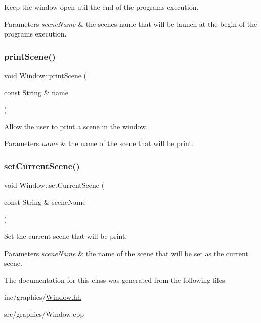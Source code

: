 Keep the window open util the end of the program\textquotesingle{}s execution. 


\begin{DoxyParams}{Parameters}
{\em \textquotesingle{}scene\+Name\textquotesingle{}} & the scene\textquotesingle{}s name that will be launch at the begin of the program\textquotesingle{}s execution. \\
\hline
\end{DoxyParams}
\mbox{\label{classWindow_a9e73c1dc8b22cdf16e6446af6f7ade48}} 
\subsubsection{\texorpdfstring{print\+Scene()}{printScene()}}
{\footnotesize\ttfamily void Window\+::print\+Scene (\begin{DoxyParamCaption}\item[{const String \&}]{name }\end{DoxyParamCaption})}



Allow the user to print a scene in the window. 


\begin{DoxyParams}{Parameters}
{\em \textquotesingle{}name\textquotesingle{}} & the name of the scene that will be print. \\
\hline
\end{DoxyParams}
\mbox{\label{classWindow_a3342dc02339a5974d5c6fcefd91d0cbf}} 
\subsubsection{\texorpdfstring{set\+Current\+Scene()}{setCurrentScene()}}
{\footnotesize\ttfamily void Window\+::set\+Current\+Scene (\begin{DoxyParamCaption}\item[{const String \&}]{scene\+Name }\end{DoxyParamCaption})}



Set the current scene that will be print. 


\begin{DoxyParams}{Parameters}
{\em \textquotesingle{}scene\+Name\textquotesingle{}} & the name of the scene that will be set as the current scene. \\
\hline
\end{DoxyParams}


The documentation for this class was generated from the following files\+:\begin{DoxyCompactItemize}
\item 
inc/graphics/\hyperlink{Window_8hh}{Window.\+hh}\item 
src/graphics/Window.\+cpp\end{DoxyCompactItemize}
